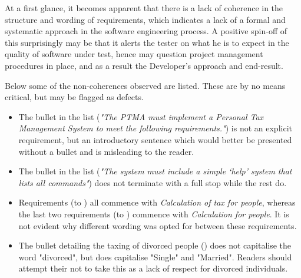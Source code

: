 At a first glance, it becomes apparent that there is a lack of coherence in the structure and wording of requirements, which indicates a lack of a formal and systematic approach in the software engineering process.  A positive spin-off of this surprisingly may be that it alerts the tester on what he is to expect in the quality of software under test, hence may question project management procedures in place, and as a result the Developer’s approach and end-result.
\par
Below some of the non-coherences observed are listed. These are by no means critical, but may be flagged as defects.
\begin{itemize}
    \item The  bullet in the list (\textit{"The PTMA must implement a Personal Tax Management System to meet the following requirements."}) is not an explicit requirement, but an introductory sentence which would better be presented without a bullet and is misleading to the reader. 
    \item The  bullet in the list (\textit{"The system must include a simple ‘help’ system that lists all commands"}) does not terminate with a full stop while the rest do. 
    \item Requirements (\REightFive to \REightTen) all commence with \textit{Calculation of tax for people}, whereas the last two requirements (\REightEleven to \REightTwelve) commence with \textit{Calculation for people}. It is not evident why different wording was opted for between these requirements. 
    \item The bullet detailing the taxing of divorced people (\REightSeven) does not capitalise the word "divorced", but does capitalise "Single" and "Married". Readers should attempt their not to take this as a lack of respect for divorced individuals. 
\end{itemize}

